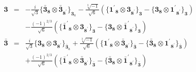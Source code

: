 \documentclass[english]{article}
\newcommand{\subcg}[3]{\big\{ {#1}\otimes{#2}\big\}^{}_{#3}}
\newcommand{\rep}[1]{\mathbf{#1}}
\begin{document}
\begin{itemize}
\begin{eqnarray*}
\\
\rep{3} &=& -\frac{i}{\sqrt{3}}\subcg{\rep{\bar{3}}_{\rep{8}}}{\rep{\bar{3}}_{\rep{8^{\prime}}}}{\rep{3}_{a}}-\frac{\sqrt[3]{-1}}{\sqrt{6}}\left(\subcg{\rep{1^{\prime}}_{\rep{8}}}{\rep{3}_{\rep{8^{\prime}}}}{\rep{3}}-\subcg{\rep{3}_{\rep{8}}}{\rep{1^{\prime}}_{\rep{8^{\prime}}}}{\rep{3}}\right) \\ 
 & & -\frac{(-1)^{2/3}}{\sqrt{6}}\left(\subcg{\rep{\bar{1}^{\prime}}_{\rep{8}}}{\rep{3}_{\rep{8^{\prime}}}}{\rep{3}}-\subcg{\rep{3}_{\rep{8}}}{\rep{\bar{1}^{\prime}}_{\rep{8^{\prime}}}}{\rep{3}}\right)
\\
\rep{\bar{3}} &=& \frac{i}{\sqrt{3}}\subcg{\rep{3}_{\rep{8}}}{\rep{3}_{\rep{8^{\prime}}}}{\rep{\bar{3}}_{a}}+\frac{\sqrt[3]{-1}}{\sqrt{6}}\left(\subcg{\rep{1^{\prime}}_{\rep{8}}}{\rep{\bar{3}}_{\rep{8^{\prime}}}}{\rep{\bar{3}}}-\subcg{\rep{\bar{3}}_{\rep{8}}}{\rep{1^{\prime}}_{\rep{8^{\prime}}}}{\rep{\bar{3}}}\right) \\ 
 & & +\frac{(-1)^{2/3}}{\sqrt{6}}\left(\subcg{\rep{\bar{1}^{\prime}}_{\rep{8}}}{\rep{\bar{3}}_{\rep{8^{\prime}}}}{\rep{\bar{3}}}-\subcg{\rep{\bar{3}}_{\rep{8}}}{\rep{\bar{1}^{\prime}}_{\rep{8^{\prime}}}}{\rep{\bar{3}}}\right)
\end{eqnarray*}
\end{itemize}
\end{document}
